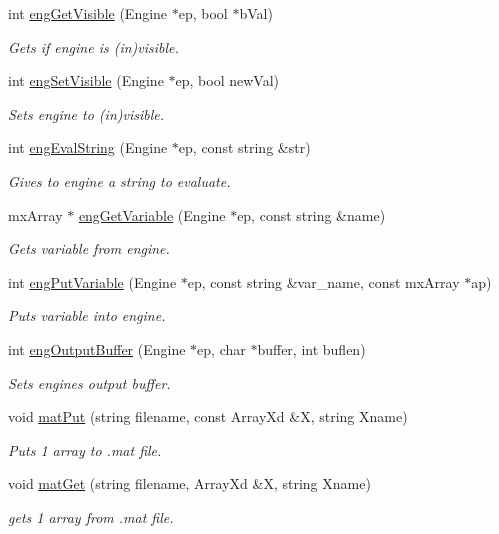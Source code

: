 \begin{DoxyCompactItemize}
int \hyperlink{class_c_m_a_t_l_a_b_afcedcfb4e40f611ea84da905c40d5906}{eng\-Get\-Visible} (Engine $\ast$ep, bool $\ast$b\-Val)
\begin{DoxyCompactList}\small\item\em Gets if engine is (in)visible. \end{DoxyCompactList}\item 
int \hyperlink{class_c_m_a_t_l_a_b_ab49201f79e5e7ef10e0db6af0a1abdcb}{eng\-Set\-Visible} (Engine $\ast$ep, bool new\-Val)
\begin{DoxyCompactList}\small\item\em Sets engine to (in)visible. \end{DoxyCompactList}\item 
int \hyperlink{class_c_m_a_t_l_a_b_adc555e9306ea2d2c4945661b0af5cd34}{eng\-Eval\-String} (Engine $\ast$ep, const string \&str)
\begin{DoxyCompactList}\small\item\em Gives to engine a string to evaluate. \end{DoxyCompactList}\item 
mx\-Array $\ast$ \hyperlink{class_c_m_a_t_l_a_b_a57bbc476315ce8e01a65167dc971b02f}{eng\-Get\-Variable} (Engine $\ast$ep, const string \&name)
\begin{DoxyCompactList}\small\item\em Gets variable from engine. \end{DoxyCompactList}\item 
int \hyperlink{class_c_m_a_t_l_a_b_aadcd76bf7c7f98e9e08a5e44b93e2e4f}{eng\-Put\-Variable} (Engine $\ast$ep, const string \&var\-\_\-name, const mx\-Array $\ast$ap)
\begin{DoxyCompactList}\small\item\em Puts variable into engine. \end{DoxyCompactList}\item 
int \hyperlink{class_c_m_a_t_l_a_b_a184b784ab8afe19c1003f27a1238b013}{eng\-Output\-Buffer} (Engine $\ast$ep, char $\ast$buffer, int buflen)
\begin{DoxyCompactList}\small\item\em Sets engines output buffer. \end{DoxyCompactList}\item 
void \hyperlink{class_c_m_a_t_l_a_b_ada82733d0bc4be6967e2c7f487abc041}{mat\-Put} (string filename, const Array\-Xd \&X, string Xname)
\begin{DoxyCompactList}\small\item\em Puts 1 array to .mat file. \end{DoxyCompactList}\item 
void \hyperlink{class_c_m_a_t_l_a_b_a22e4a6d97466ecfdc611a9e2970e3fde}{mat\-Get} (string filename, Array\-Xd \&X, string Xname)
\begin{DoxyCompactList}\small\item\em gets 1 array from .mat file. \end{DoxyCompactList}\end{DoxyCompactItemize}
